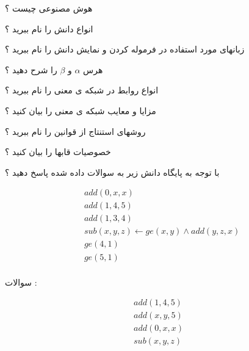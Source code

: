 \documentclass[12pt]{article}
\begin{document}

\noindent
هوش مصنوعی چیست ؟


\vspace{30pt}

\noindent
انواع دانش را نام ببرید ؟

\vspace{30pt}

\noindent
زبانهای مورد استفاده در فرموله کردن و نمایش دانش را نام ببرید ؟

\vspace{30pt}


\noindent
هرس
\textbf{$\alpha$}
و
\textbf{$\beta$}
را شرح دهید ؟


\vspace{30pt}


\noindent
انواع روابط در شبکه ی معنی را نام ببرید ؟


\vspace{30pt}



\noindent
مزایا و معایب شبکه ی معنی را بیان کنید ؟


\vspace{30pt}



\noindent
روشهای استنتاج از قوانین را نام ببرید ؟


\vspace{30pt}


\noindent
خصوصیات قابها را بیان کنید ؟


\vspace{30pt}



\noindent
با توجه به پایگاه دانش زیر به سوالات داده شده پاسخ دهید ؟





\begin{latin}
\begin{align*}
&add(0,x,x) \\
&add(1,4,5) \\
&add(1,3,4) \\
&sub(x,y,z) \leftarrow ge(x,y) \land add(y,z,x) \\
&ge(4,1) \\
&ge(5,1) \\
\end{align*}
\end{latin}


\noindent
سوالات :


\begin{latin}
\begin{align*}
add(1,4,5) \\
add(x,y,5) \\
add(0,x,x) \\
sub(x,y,z) \\
\end{align*}
\end{latin}
\end{document}
